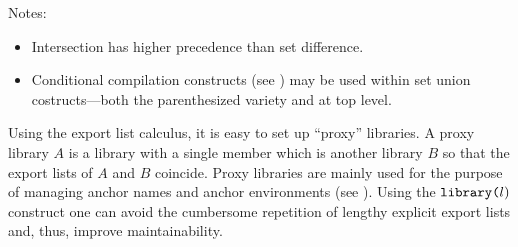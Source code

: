 \noindent Notes:
\begin{itemize}\setlength{\itemsep}{0pt}
\item Intersection has higher precedence than set difference.
\item Conditional compilation constructs (see
) may be used within set union
costructs---both the parenthesized variety and at top level.
\end{itemize}

Using the export list calculus, it is easy to set up ``proxy''
libraries.  A proxy library $A$ is a library with a single member
which is another library $B$ so that the export lists of $A$ and $B$
coincide.  Proxy libraries are mainly used for the purpose of managing
anchor names and anchor environments (see
).  Using the $\mbox{\tt
library(}l\mbox{)}$ construct one can avoid the cumbersome repetition
of lengthy explicit export lists and, thus, improve maintainability.
